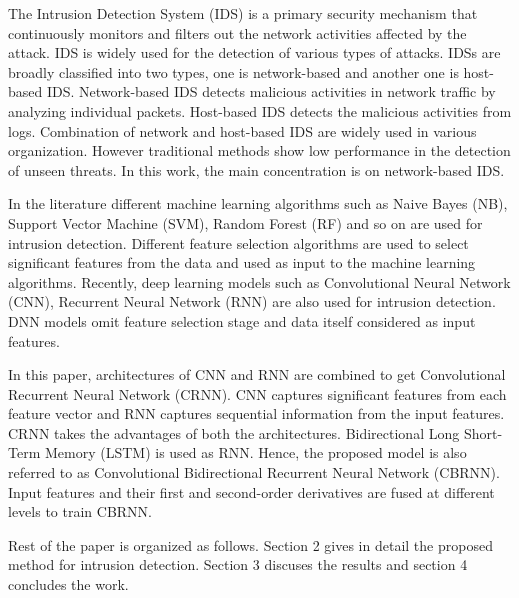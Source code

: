 \documentclass[review]{elsarticle}
\begin{document}
The Intrusion Detection System (IDS) is a primary security mechanism that continuously monitors and filters out the network activities affected by the attack. IDS is widely used for the detection of various types of attacks.
IDSs are broadly classified into two types, one is network-based and another one is host-based IDS. Network-based IDS detects malicious activities in network traffic by analyzing individual packets. Host-based IDS detects the malicious activities from logs.
Combination of network and host-based IDS are widely used in various organization. However traditional methods show low performance in the detection of unseen threats. In this work, the main concentration is on network-based IDS.

In the literature different machine learning algorithms such as Naive Bayes (NB), Support Vector Machine (SVM), Random Forest (RF) and so on are used for intrusion detection. Different feature selection algorithms are used to select significant features from the data and used as input to the machine learning algorithms. 
Recently, deep learning models such as Convolutional Neural Network (CNN), Recurrent Neural Network (RNN) are also used for intrusion detection. DNN models omit feature selection stage and data itself considered as input features. 

In this paper, architectures of CNN and RNN are combined to get Convolutional Recurrent Neural Network (CRNN). CNN captures significant features from each feature vector and RNN captures sequential information from the input features. CRNN takes the advantages of both the architectures. Bidirectional Long Short-Term Memory (LSTM) is used as RNN. Hence, the proposed model is also referred to as Convolutional Bidirectional Recurrent Neural Network (CBRNN).   Input features and their first and second-order derivatives are fused at different levels to train CBRNN.

Rest of the paper is organized as follows.  Section 2 gives in detail the proposed method for intrusion detection. Section 3 discuses the results and section 4 concludes the work.
\end{document}

